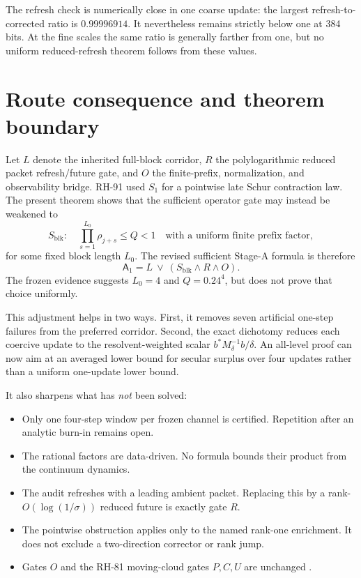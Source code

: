 \documentclass[11pt]{article}
\theoremstyle{definition}
\theoremstyle{remark}
\begin{document}
The refresh check is numerically close in one coarse update: the largest
refresh-to-corrected ratio is $0.99996914$.  It nevertheless remains strictly
below one at 384 bits.  At the fine scales the same ratio is generally farther
from one, but no uniform reduced-refresh theorem follows from these values.

\section{Route consequence and theorem boundary}

Let $L$ denote the inherited full-block corridor, $R$ the polylogarithmic
reduced packet refresh/future gate, and $O$ the finite-prefix,
normalization, and observability bridge.  RH-91 used $S_1$ for a pointwise
late Schur contraction law.  The present theorem shows that the sufficient
operator gate may instead be weakened to
\[
 S_{\mathrm{blk}}:
 \quad
 \prod_{s=1}^{L_0}\rho_{j+s}\le Q<1
 \quad\text{with a uniform finite prefix factor},
\]
for some fixed block length $L_0$.  The revised sufficient Stage-A formula is
therefore
\begin{equation}
 \mathsf A_1=L\ \vee\ (S_{\mathrm{blk}}\wedge R\wedge O).
 \label{eq:frontier}
\end{equation}
The frozen evidence suggests $L_0=4$ and $Q=0.24^4$, but does not prove that
choice uniformly.

This adjustment helps in two ways.  First, it removes seven artificial
one-step failures from the preferred corridor.  Second, the exact dichotomy
reduces each coercive update to the resolvent-weighted scalar
$b^*M_\delta^{-1}b/\delta$.  An all-level proof can now aim at an averaged
lower bound for secular surplus over four updates rather than a uniform
one-update lower bound.

It also sharpens what has \emph{not} been solved:

\begin{itemize}[leftmargin=2em]
\item Only one four-step window per frozen channel is certified.  Repetition
after an analytic burn-in remains open.
\item The rational factors are data-driven.  No formula bounds their product
from the continuum dynamics.
\item The audit refreshes with a leading ambient packet.  Replacing this by a
rank-$O(\log(1/\sigma))$ reduced future is exactly gate $R$.
\item The pointwise obstruction applies only to the named rank-one
enrichment.  It does not exclude a two-direction corrector or rank jump.
\item Gates $O$ and the RH-81 moving-cloud gates $P,C,U$ are unchanged
\citep{WangTwoCorridors2026,WangRouteReview2026}.
\end{itemize}
\end{document}

